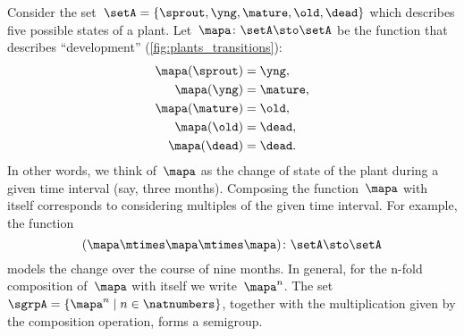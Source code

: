 \begin{example}
	\label{exa:plant-trafo-semigroup}
	Consider the set~$\setA = \{ \sprout, \yng, \mature, \old, \dead \}$ which describes five possible states of a plant.
	Let~$\mapa \colon \setA \sto \setA$ be the function that describes ``development'' (\cref{fig:plants_transitions}):
	\begin{align*}
		\mapa(\sprout) & =  \yng,    \\
		\mapa(\yng)    & =  \mature, \\
		\mapa(\mature) & =  \old,    \\
		\mapa( \old)   & = \dead,    \\
		\mapa (\dead)  & = \dead.
	\end{align*}
	In other words, we think of~$\mapa$ as the change of state of the plant during a given time interval (say, three months).
	Composing the function~$\mapa$ with itself corresponds to considering multiples of the given time interval.
	For example, the function
	\begin{equation*}
		(\mapa \mtimes \mapa \mtimes \mapa)
		\colon \setA \sto \setA
	\end{equation*}
	models the change over the course of nine months.
	In general, for the n-fold composition of~$\mapa$ with itself we write~$\mapa^n$.
	The set~$\sgrpA = \{ \mapa^n \mid n \in \natnumbers \}$, together with the multiplication given by the composition operation, forms a semigroup.
\end{example}
%
